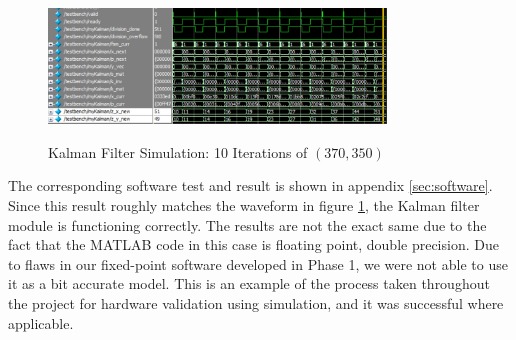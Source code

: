 \documentclass[11pt]{article} %
\begin{document}
\begin{figure}[h]
\centering
\caption{Kalman Filter Simulation: 10 Iterations of $(370,350)$}
\includegraphics[width=0.8\textwidth]{./images/kalman_sim.jpg}
\label{fig:wave}
\end{figure}
The corresponding software test and result is shown in appendix \ref{sec:software}. Since this result roughly matches the waveform in figure \ref{fig:wave}, the Kalman filter module is functioning correctly. The results are not the exact same due to the fact that the MATLAB code in this case is floating point, double precision. Due to flaws in our fixed-point software developed in Phase 1, we were not able to use it as a bit accurate model. This is an example of the process taken throughout the project for hardware validation using simulation, and it was successful where applicable.
\end{document}

